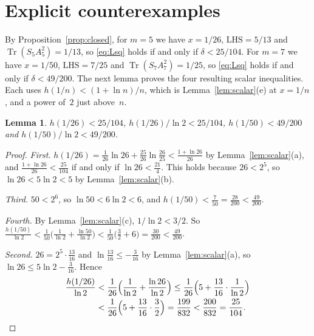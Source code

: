 \documentclass[11pt]{amsart}
\newtheorem{lemma}[theorem]{Lemma}
\theoremstyle{definition}\newtheorem{definition}[theorem]{Definition}
\theoremstyle{remark}\newtheorem{remark}[theorem]{Remark}
\DeclareMathOperator{\Tr}{Tr}
\newcommand{\LHS}{\mathrm{LHS}}
\begin{document}
\section{Explicit counterexamples}\label{sec:witness}

By Proposition~\ref{prop:closed}, for \(m=5\) we have \(x=1/26\), \(\LHS=5/13\) and \(\Tr(S_5A_5^2)=1/13\), so \eqref{eq:Lsq} holds if and only if \(\delta<25/104\). For \(m=7\) we have \(x=1/50\), \(\LHS=7/25\) and \(\Tr(S_7A_7^2)=1/25\), so \eqref{eq:Lsq} holds if and only if \(\delta<49/200\). The next lemma proves the four resulting scalar inequalities. Each uses \(h(1/n)<(1+\ln n)/n\), which is Lemma~\ref{lem:scalar}(e) at \(x=1/n\), and a power of~\(2\) just above~\(n\).

\begin{lemma}\label{lem:four}
\(h(1/26)<25/104\), \(h(1/26)/\ln2<25/104\), \(h(1/50)<49/200\) and \(h(1/50)/\ln2<49/200\).
\end{lemma}

\begin{proof}
\emph{First.} \(h(1/26)=\frac{1}{26}\ln26+\frac{25}{26}\ln\frac{26}{25}<\frac{1+\ln26}{26}\) by Lemma~\ref{lem:scalar}(a), and \(\frac{1+\ln26}{26}<\frac{25}{104}\) if and only if \(\ln26<\frac{21}{4}\). This holds because \(26<2^5\), so \(\ln26<5\ln2<5\) by Lemma~\ref{lem:scalar}(b).

\emph{Third.} \(50<2^6\), so \(\ln50<6\ln2<6\), and \(h(1/50)<\frac{7}{50}=\frac{28}{200}<\frac{49}{200}\).

\emph{Fourth.} By Lemma~\ref{lem:scalar}(c), \(1/\ln2<3/2\). So \(\frac{h(1/50)}{\ln2}<\frac{1}{50}\bigl(\frac{1}{\ln2}+\frac{\ln50}{\ln2}\bigr)<\frac{1}{50}\bigl(\frac32+6\bigr)=\frac{30}{200}<\frac{49}{200}\).

\emph{Second.} \(26=2^5\cdot\frac{13}{16}\) and \(\ln\frac{13}{16}\le-\frac{3}{16}\) by Lemma~\ref{lem:scalar}(a), so \(\ln26\le5\ln2-\frac{3}{16}\). Hence
\begin{align*}
\frac{h(1/26)}{\ln2}&<\frac{1}{26}\Bigl(\frac{1}{\ln2}+\frac{\ln26}{\ln2}\Bigr)\le\frac{1}{26}\Bigl(5+\frac{13}{16}\cdot\frac{1}{\ln2}\Bigr)\\
&<\frac{1}{26}\Bigl(5+\frac{13}{16}\cdot\frac32\Bigr)=\frac{199}{832}<\frac{200}{832}=\frac{25}{104}. \qedhere
\end{align*}
\end{proof}
\end{document}
